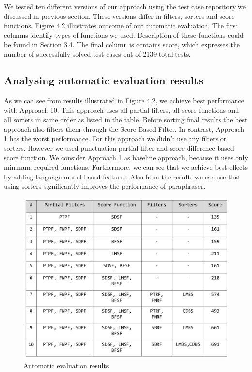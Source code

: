 We tested ten different versions of our approach using the test case repository we discussed in previous section. These versions differ in filters, sorters and score functions. Figure 4.2 illustrates outcome of our automatic evaluation. The first columns identify types of functions we used. Description of these functions could be found in Section 3.4. The final column is contains score, which expresses the number of successfully solved test cases out of 2139 total tests.

\subsection{Analysing automatic evaluation results}

As we can see from results illustrated in Figure 4.2, we achieve best performance with Approach 10. This approach uses all partial filters, all score functions and all sorters in same order as listed in the table. Before sorting final results the best approach also filters them through the Score Based Filter. In contrast, Approach 1 has the worst performance. For this approach we didn't use any filters or sorters. However we used punctuation partial filter and score difference based score function. We consider Approach 1 as baseline approach, because it uses only minimum required functions. Furthermore, we can see that we achieve best effects by adding language model based features. Also from the results we can see that using sorters significantly improves the performance of paraphraser.


\begin{figure}
 \centering 
 \includegraphics[scale=0.75]{g/eval-auto-results.pdf}
 \caption{Automatic evaluation results}
\end{figure}


